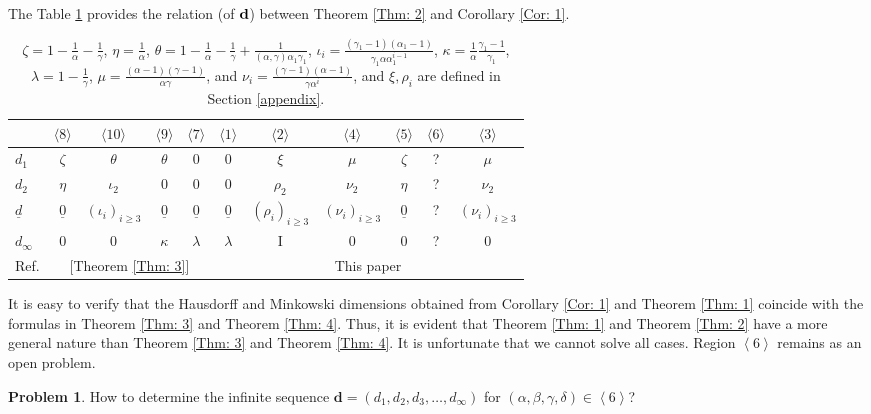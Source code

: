 \documentclass{amsart}
\theoremstyle{definition}
\newtheorem{problem}{Problem}
\numberwithin{equation}{section}%
\begin{document}
The Table \ref{tab: 1} provides the relation (of ${\bf d}$) between Theorem \ref{Thm: 2} and Corollary \ref{Cor: 1}. \begin{table}[]
    \centering
    \begin{tabular}{ |l|cccc|c|c|ccc|c| }
 \hline
 &$\langle 8\rangle$&$\langle 10\rangle$&$\langle 9\rangle$&$\langle 7\rangle$&$\langle 1\rangle$&$\langle 2\rangle$&$\langle 4\rangle$&$\langle 5\rangle$&$\langle 6\rangle$&$\langle 3\rangle$\\
 \hline
 $d_1$  & $\zeta$    &$\theta$&  $\theta$& 0  &0&$\xi$&$\mu$&$\zeta$&?&$\mu$\\
 $d_2$&   $\eta$  & $\iota_2$   &0& 0  &0&$\rho_2$&$\nu_2$&$\eta$&?&$\nu_2$\\
 $\underline{d}$&$\underline{0}$& $(\iota_i)_{i\geq 3}$&$\underline{0}$&$\underline{0}$&$\underline{0}$ &$(\rho_i)_{i\geq 3}$&$(\nu_i)_{i\geq 3}$&$\underline{0}$&?&$(\nu_i)_{i\geq 3}$\\
 $d_\infty$ &0& 0& $\kappa$ & $\lambda$&$\lambda$&I&0&0&?&0\\
  \hline
 Ref.& \multicolumn{4}{c|}{[Theorem \ref{Thm: 3}]}  & \multicolumn{6}{c|}{This paper} \\
 \hline
\end{tabular}
    \caption{$\zeta=1-\frac{1}{\alpha}-\frac{1}{\gamma}$, $\eta=\frac{1}{\alpha}$, $\theta=1-\frac{1}{\alpha}-\frac{1}{\gamma}+\frac{1}{(\alpha,\gamma)\alpha_1 \gamma_1}$, $\iota_i=\frac{(\gamma_1-1)(\alpha_1-1)}{\gamma_1\alpha\alpha_1^{i-1}}$, $\kappa=\frac{1}{\alpha}\frac{\gamma_1-1}{\gamma_1}$, $\lambda=1-\frac{1}{\gamma}$, $\mu=\frac{(\alpha-1)(\gamma-1)}{\alpha\gamma}$, and $\nu_i= \frac{(\gamma-1)(\alpha-1)}{\gamma\alpha^i}$, and $\xi, \rho_i$ are defined in Section \ref{appendix}.}
    \label{tab: 1}
\end{table}
It is easy to verify that the Hausdorff and Minkowski dimensions obtained
from Corollary \ref{Cor: 1} and Theorem \ref{Thm: 1} coincide with the formulas in Theorem \ref{Thm: 3} and Theorem \ref{Thm: 4}. Thus, it is
evident that Theorem \ref{Thm: 1} and Theorem \ref{Thm: 2} have a more general nature than Theorem \ref{Thm: 3} and Theorem \ref{Thm: 4}. It is unfortunate that we cannot solve all cases. Region $\left\langle 6\right\rangle$ remains as an open problem.

\begin{problem}
How to determine the infinite sequence $\mathbf{d}=(d_{1},d_{2},d_{3},\ldots,d_{\infty })$ for $(\alpha ,\beta ,\gamma ,\delta )\in \left\langle
6\right\rangle $?
\end{problem}
\end{document}
